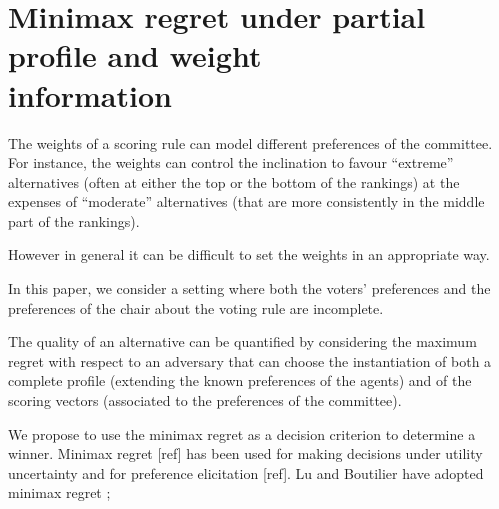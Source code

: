 \documentclass[12pt]{article}
\newcommand{\ppref}{\succ^\text{p}}%
\DeclareMathOperator{\PMR}{PMR}
\DeclareMathOperator{\MR}{MR}
\DeclareMathOperator{\MMR}{MMR}
\begin{document}
% 

\section[Minimax regret under partial profile and weight information]{Minimax regret under partial profile and weight \\ information}
\label{sec:mmr}


The weights of a scoring rule can model different preferences of the committee. 
For instance, the weights can control the inclination to favour ``extreme'' alternatives (often at either the top or the bottom of the rankings) at the expenses of ``moderate'' alternatives (that are more consistently in the middle part of the rankings).

However in general it can be difficult to set the weights in an appropriate way.

In this paper, we consider a setting where both the voters' preferences and the preferences of the chair about the voting rule are incomplete.


\medskip
The quality of an alternative can be quantified by considering the maximum regret with respect to an adversary that can choose the instantiation of both a complete profile (extending the known preferences of the agents) and of the scoring vectors (associated to the preferences of the committee).

We propose to use the minimax regret as a decision criterion to determine a winner.
Minimax regret [ref] has been used for making decisions under utility uncertainty and for preference elicitation [ref].
Lu and Boutilier \cite{Lu2011} have adopted minimax regret ; 
\end{document}

